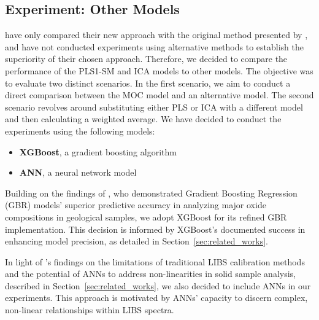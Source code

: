 \subsection{Experiment: Other Models}\label{sec:experiment_other_models}
\citet{cleggRecalibrationMarsScience2017} have only compared their new approach with the original method presented by \citet{wiensPreFlight3}, and have not conducted experiments using alternative methods to establish the superiority of their chosen approach.
Therefore, we decided to compare the performance of the PLS1-SM and ICA models to other models.
The objective was to evaluate two distinct scenarios.
In the first scenario, we aim to conduct a direct comparison between the MOC model and an alternative model. The second scenario revolves around substituting either PLS or ICA with a different model and then calculating a weighted average.
We have decided to conduct the experiments using the following models:

\begin{itemize}
	\item \textbf{XGBoost}, a gradient boosting algorithm \cite{chen_xgboost_2016}
	\item \textbf{ANN}, a neural network model
\end{itemize}

Building on the findings of \citet{andersonPostlandingMajorElement2022}, who demonstrated Gradient Boosting Regression (GBR) models' superior predictive accuracy in analyzing major oxide compositions in geological samples, we adopt XGBoost for its refined GBR implementation.
This decision is informed by XGBoost's documented success in enhancing model precision, as detailed in Section~\ref{sec:related_works}.

In light of \citeauthor{takahashi_quantitative_2017}'s findings on the limitations of traditional LIBS calibration methods and the potential of ANNs to address non-linearities in solid sample analysis, described in Section~\ref{sec:related_works}, we also decided to include ANNs in our experiments.
This approach is motivated by ANNs' capacity to discern complex, non-linear relationships within LIBS spectra.

